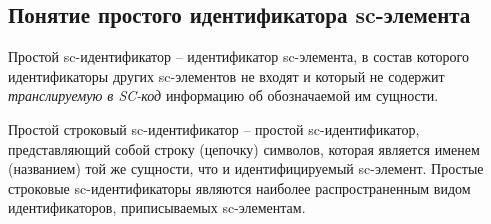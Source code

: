 \subsection{Понятие простого идентификатора sc-элемента}

Простой sc-идентификатор -- идентификатор sc-элемента, в состав которого идентификаторы других sc-элементов не входят и который не содержит \textit{транслируемую в SC-код} информацию об обозначаемой им сущности. 

Простой строковый sc-идентификатор -- простой sc-идентификатор, представляющий собой строку (цепочку) символов, которая является именем (названием) той же сущности, что и идентифицируемый sc-элемент. Простые строковые sc-идентификаторы являются наиболее распространенным видом идентификаторов, приписываемых sc-элементам.

